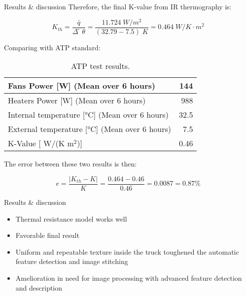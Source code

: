 \begin{frame}{Results \& discussion}
 Therefore, the final K-value from IR thermography is:

    \begin{equation*}
    K_{th}=\frac{\bar{q}}{\Delta ̅\theta} =\frac{11.724\; W/m^2}{(32.79-7.5)\;K}=0.464\; W/K\cdot m^2 
    \end{equation*}

\pause
Comparing with ATP standard:
    \begin{table}[ht]
        \centering
        \caption{ATP test results.}
        \begin{tabular}{l|r}
            \hline
            Fans Power [W] (Mean over 6 hours) & 144 \\
            \hline 
            Heaters Power [W] (Mean over 6 hours) &   988\\
            \hline
            Internal temperature [°C] (Mean over 6 hours) &   32.5\\
            \hline
            External temperature [°C] (Mean over 6 hours) &   7.5\\
            \hline
            K-Value [ W/(K m$^2 $)] & 0.46 \\
            \hline
        \end{tabular}
    \end{table}
\pause
The error between these two results is then:

    \begin{equation*}
        e=  \frac{|K_{th}-K|}{K}=\frac{0.464-0.46}{0.46}=0.0087=0.87\%
    \end{equation*}
\end{frame}

\begin{frame}{Results \& discussion}
    \begin{itemize}[<+->]
    \pause
    \large
        \item Thermal resistance model works well
        \item Favorable final result
        \item Uniform and repeatable texture inside the truck toughened the automatic feature detection and image stitching
        \item Amelioration in need for image processing with advanced feature detection and description
    \end{itemize}
\end{frame}

